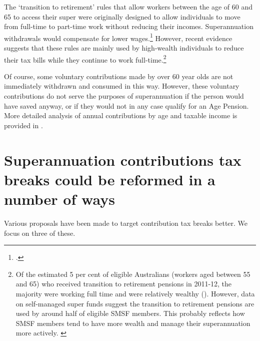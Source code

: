 \documentclass{grattanAlpha}
\begin{document}
The ‘transition to retirement’ rules that allow workers between the age of 60 and 65 to access their super were originally designed to allow individuals to move from full-time to part-time work without reducing their incomes. Superannuation withdrawals would compensate for lower wages.\footcite{ASIC2015TransitionToRetirement}  However, recent evidence suggests that these rules are mainly used by high-wealth individuals to reduce their tax bills while they continue to work full-time.\footnote{Of the estimated 5 per cent of eligible Australians (workers aged between 55 and 65) who received transition to retirement pensions in 2011-12, the majority were working full time and were relatively wealthy (\textcite[][20]{ProductivityCommission2015SuperPolicyPostRetirement}). However, data on self-managed super funds suggest the transition to retirement pensions are used by around half of eligible SMSF members. This probably reflects how SMSF members tend to have more wealth and manage their superannuation more actively. \textcite[][144]{ProductivityCommission2015SuperPolicyPostRetirement}}  

Of course, some voluntary contributions made by over 60 year olds are not immediately withdrawn and consumed in this way. However, these voluntary contributions do not serve the purposes of superannuation if the person would have saved anyway, or if they would not in any case qualify for an Age Pension. More detailed analysis of annual contributions by age and taxable income is provided in .

\section{Superannuation contributions tax breaks could be reformed in a number of ways}
Various proposals have been made to target contribution tax  breaks better. We focus on three of these.
\end{document}
